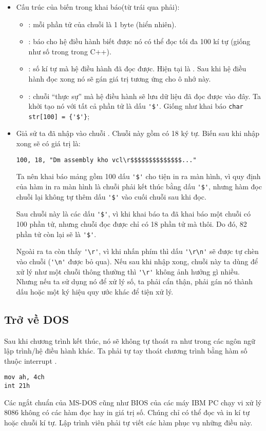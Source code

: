 \documentclass[main.tex]{subfiles}
\begin{document}
\begin{itemize}
    \item Cấu trúc của biến  trong khai báo(từ trái qua phải):
    \begin{itemize}
        \item {}: mỗi phần tử của chuỗi là 1 byte (hiển nhiên).
        \item {}: báo cho hệ điều hành biết được nó có thể đọc tối đa 100 kí tự (giống như số  trong  trong C++).
        \item {}: số kí tự mà hệ điều hành đã đọc được. Hiện tại là . Sau khi hệ điều hành đọc xong nó sẽ gán giá trị tương ứng cho ô nhớ này.
        \item {}: chuỗi ``thực sự'' mà hệ điều hành sẽ lưu dữ liệu đã đọc được vào đây. Ta khởi tạo nó với tất cả phần tử là dấu \verb#'$'#. Giống như khai báo \verb#char str[100] = {'$'}#;
    \end{itemize}
    \item Giả sử ta đã nhập vào chuỗi . Chuỗi này gồm có 18 ký tự. Biến  sau khi nhập xong sẽ có giá trị là:
    \begin{verbatim}
100, 18, "Dm assembly kho vcl\r$$$$$$$$$$$$$$..."
    \end{verbatim} 
    \par Ta nên khai báo mảng gồm 100 dấu \verb#'$'# cho tiện in ra màn hình, vì quy định của hàm in ra màn hình là chuỗi phải kết thúc bằng dấu \verb#'$'#, nhưng hàm đọc chuỗi lại không tự thêm dấu \verb#'$'# vào cuối chuỗi sau khi đọc.\bigskip
    \par Sau chuỗi này là các dấu  \verb#'$'#, vì khi khai báo ta đã khai báo một chuỗi có 100 phần tử, nhưng chuỗi đọc được chỉ có 18 phần tử mà thôi. Do đó, 82 phần tử còn lại sẽ là \verb#'$'#. \bigskip
    \par Ngoài ra ta còn thấy \verb#'\r'#, vì khi nhấn phím  thì dấu \verb#'\r\n'# sẽ được tự chèn vào chuỗi (\verb#'\n'# được bỏ qua). Nếu sau khi nhập xong, chuỗi này ta dùng để xử lý như một chuỗi thông thường thì \verb#'\r'# không ảnh hưởng gì nhiều. Nhưng nếu ta sử dụng nó để xử lý số, ta phải cẩn thận, phải gán nó thành dấu  hoặc một ký hiệu quy ước khác để tiện xử lý.


\end{itemize}

\subsection*{Trở về DOS}
Sau khi chương trình kết thúc, nó sẽ không tự thoát ra như trong các ngôn ngữ lập trình/hệ điều hành khác. Ta phải tự tay thoát chương trình bằng hàm số  thuộc interrupt .
\begin{verbatim}
mov ah, 4ch
int 21h
\end{verbatim}

Các ngắt chuẩn của MS-DOS cũng như BIOS của các máy IBM PC chạy vi xử lý 8086 không có các hàm đọc hay in giá trị số. Chúng chỉ có thể đọc và in kí tự hoặc chuỗi kí tự. Lập trình viên phải tự viết các hàm phục vụ những điều này.
\end{document}
